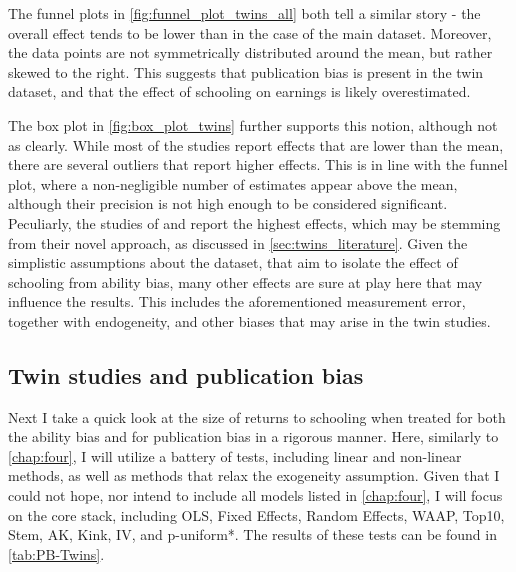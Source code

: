 The funnel plots in \autoref{fig:funnel_plot_twins_all} both tell a similar story - the overall effect tends to be lower than in the case of the main dataset. Moreover, the data points are not symmetrically distributed around the mean, but rather skewed to the right. This suggests that publication bias is present in the twin dataset, and that the effect of schooling on earnings is likely overestimated.


The box plot in \autoref{fig:box_plot_twins} further supports this notion, although not as clearly. While most of the studies report effects that are lower than the mean, there are several outliers that report higher effects. This is in line with the funnel plot, where a non-negligible number of estimates appear above the mean, although their precision is not high enough to be considered significant. Peculiarly, the studies of \cite{ashenfelter1994estimates} and \cite{ashenfelter1998income} report the highest effects, which may be stemming from their novel approach, as discussed in \autoref{sec:twins_literature}. Given the simplistic assumptions about the dataset, that aim to isolate the effect of schooling from ability bias, many other effects are sure at play here that may influence the results. This includes the aforementioned measurement error, together with endogeneity, and other biases that may arise in the twin studies.


\subsection*{Twin studies and publication bias}

Next I take a quick look at the size of returns to schooling when treated for both the ability bias and for publication bias in a rigorous manner. Here, similarly to \autoref{chap:four}, I will utilize a battery of tests, including linear and non-linear methods, as well as methods that relax the exogeneity assumption. Given that I could not hope, nor intend to include all models listed in \autoref{chap:four}, I will focus on the core stack, including OLS, Fixed Effects, Random Effects, WAAP, Top10, Stem, AK, Kink, IV, and p-uniform*. The results of these tests can be found in \autoref{tab:PB-Twins}.


